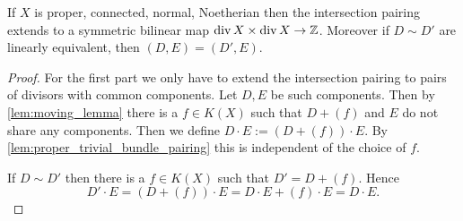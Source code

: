 \begin{proposition}\label{prop:intersection_pairing_proper_model}
	If $X$ is proper, connected, normal, Noetherian then the intersection pairing extends to a symmetric bilinear map $\operatorname{div} X \times  \operatorname{div} X \to \mathbb{Z}$. 
	Moreover if $D\sim D'$ are linearly equivalent, then $(D, E) = (D', E)$.
\end{proposition}
\begin{proof}
	For the first part we only have to extend the intersection pairing to pairs of divisors with common components. 
	Let $D, E$ be such components. 
	Then by \cref{lem:moving_lemma} there is a $f \in K(X)$ such that $D + (f)$ and $E$ do not share any components. 
	Then we define $D\cdot E := (D + (f))\cdot E$. 
	By \cref{lem:proper_trivial_bundle_pairing} this is independent of the choice of $f$. 

	If $D \sim D'$ then there is a $f \in K(X)$ such that $D' = D + (f)$. 
	Hence \[
		D'\cdot E = (D + (f))\cdot E = D\cdot E + (f)\cdot E = D\cdot E
	.\] 
\end{proof}




